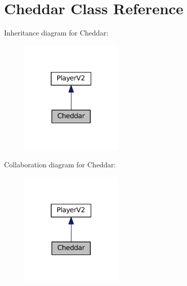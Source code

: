 \hypertarget{classCheddar}{}\section{Cheddar Class Reference}
\label{classCheddar}


Inheritance diagram for Cheddar\+:\nopagebreak
\begin{figure}[H]
\begin{center}
\leavevmode
\includegraphics[width=139pt]{classCheddar__inherit__graph}
\end{center}
\end{figure}


Collaboration diagram for Cheddar\+:\nopagebreak
\begin{figure}[H]
\begin{center}
\leavevmode
\includegraphics[width=139pt]{classCheddar__coll__graph}
\end{center}
\end{figure}
